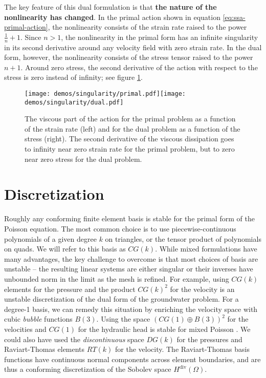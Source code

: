 \documentclass{article}
\theoremstyle{definition}
\theoremstyle{plain}
\begin{document}
The key feature of this dual formulation is that \textbf{the nature of the nonlinearity has changed}.
In the primal action shown in equation \eqref{eq:ssa-primal-action}, the nonlinearity consists of the strain rate raised to the power $\frac{1}{n} + 1$.
Since $n > 1$, the nonlinearity in the primal form has an infinite singularity in its second derivative around any velocity field with zero strain rate.
In the dual form, however, the nonlinearity consists of the stress tensor raised to the power $n + 1$.
Around zero stress, the second derivative of the action with respect to the stress is zero instead of infinity; see figure \ref{fig:primal-vs-dual}.

\begin{figure}[t]
    \texttt{[image: demos/singularity/primal.pdf]}\texttt{[image: demos/singularity/dual.pdf]}
    \caption{The viscous part of the action for the primal problem as a function of the strain rate (left) and for the dual problem as a function of the stress (right).
    The second derivative of the viscous dissipation goes to infinity near zero strain rate for the primal problem, but to zero near zero stress for the dual problem.}
    \label{fig:primal-vs-dual}
\end{figure}


\section{Discretization}

Roughly any conforming finite element basis is stable for the primal form of the Poisson equation.
The most common choice is to use piecewise-continuous polynomials of a given degree $k$ on triangles, or the tensor product of polynomials on quads.
We will refer to this basis as $CG(k)$.
While mixed formulations have many advantages, the key challenge to overcome is that most choices of basis are unstable -- the resulting linear systems are either singular or their inverses have unbounded norm in the limit as the mesh is refined.
For example, using $CG(k)$ elements for the pressure and the product $CG(k)^2$ for the velocity is an unstable discretization of the dual form of the groundwater problem.
For a degree-1 basis, we can remedy this situation by enriching the velocity space with cubic \emph{bubble} functions $B(3)$.
Using the space $(CG(1) \oplus B(3))^2$ for the velocities and $CG(1)$ for the hydraulic head is stable for mixed Poisson \citep{boffi2013mixed}.
We could also have used the \emph{discontinuous} space $DG(k)$ for the pressures and Raviart-Thomas elements $RT(k)$ for the velocity.
The Raviart-Thomas basis functions have continuous normal components across element boundaries, and are thus a conforming discretization of the Sobolev space $H^{\text{div}}(\Omega)$.
\end{document}
